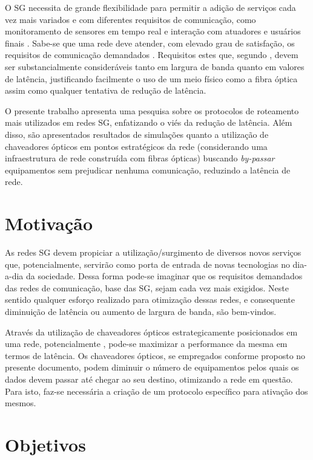 O SG necessita de grande flexibilidade para permitir a adição de serviços cada vez mais variados e com diferentes requisitos de comunicação, como monitoramento de sensores em tempo real e interação com atuadores e usuários finais \cite{Art-Aggarwal2010}. Sabe-se que uma rede  deve atender, com elevado grau de satisfação, os requisitos de comunicação demandados \cite{Conf-Lobo2008}. Requisitos estes que, segundo \cite{Art-Aggarwal2010}, devem ser substancialmente consideráveis tanto em largura de banda quanto em valores de latência, justificando facilmente o uso de um meio físico como a fibra óptica assim como qualquer tentativa de redução de latência. 

O presente trabalho apresenta uma pesquisa sobre os protocolos de roteamento mais utilizados em redes SG, enfatizando o viés da redução de latência. Além disso, são apresentados resultados de simulações quanto a utilização de chaveadores ópticos em pontos estratégicos da rede (considerando uma infraestrutura de rede construída com fibras ópticas) buscando \emph{by-passar} equipamentos sem prejudicar nenhuma comunicação, reduzindo a latência de rede.

\section{Motivação}
As redes SG devem propiciar a utilização/surgimento de diversos novos serviços que, potencialmente, servirão como porta de entrada de novas tecnologias no dia-a-dia da sociedade. Dessa forma pode-se imaginar que os requisitos demandados das redes de comunicação, base das SG, sejam cada vez mais exigidos. Neste sentido qualquer esforço realizado para otimização dessas redes, e consequente diminuição de latência ou aumento de largura de banda, são bem-vindos.

Através da utilização de chaveadores ópticos estrategicamente posicionados em uma rede, potencialmente , pode-se maximizar a performance da mesma em termos de latência. Os chaveadores ópticos, se empregados conforme proposto no presente documento, podem diminuir o número de equipamentos pelos quais os dados devem passar até chegar ao seu destino, otimizando a rede em questão. Para isto, faz-se necessária a criação de um protocolo específico para ativação dos mesmos.

\section{Objetivos}
